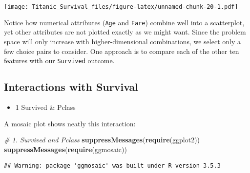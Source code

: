\documentclass[]{article}
\newenvironment{Shaded}{\begin{snugshade}}{\end{snugshade}}
\newcommand{\KeywordTok}[1]{\textcolor[rgb]{0.13,0.29,0.53}{\textbf{#1}}}
\newcommand{\DataTypeTok}[1]{\textcolor[rgb]{0.13,0.29,0.53}{#1}}
\newcommand{\DecValTok}[1]{\textcolor[rgb]{0.00,0.00,0.81}{#1}}
\newcommand{\StringTok}[1]{\textcolor[rgb]{0.31,0.60,0.02}{#1}}
\newcommand{\CommentTok}[1]{\textcolor[rgb]{0.56,0.35,0.01}{\textit{#1}}}
\newcommand{\OperatorTok}[1]{\textcolor[rgb]{0.81,0.36,0.00}{\textbf{#1}}}
\newcommand{\NormalTok}[1]{#1}
\providecommand{\tightlist}{%
  \setlength{\itemsep}{0pt}\setlength{\parskip}{0pt}}
\begin{document}
\texttt{[image: Titanic\_Survival\_files/figure-latex/unnamed-chunk-20-1.pdf]}

Notice how numerical attributes (\texttt{Age} and \texttt{Fare}) combine
well into a scatterplot, yet other attributes are not plotted exactly as
we might want. Since the problem space will only increase with
higher-dimensional combinations, we select only a few choice pairs to
consider. One approach is to compare each of the other ten features with
our \texttt{Survived} outcome.

\subsection{Interactions with
Survival}\label{interactions-with-survival}

\begin{itemize}
\tightlist
\item
  1 Survived \& Pclass
\end{itemize}

A mosaic plot shows neatly this interaction:

\begin{Shaded}
\begin{Highlighting}[]
\CommentTok{# 1. Survived and Pclass }
\KeywordTok{suppressMessages}\NormalTok{(}\KeywordTok{require}\NormalTok{(ggplot2))}
\KeywordTok{suppressMessages}\NormalTok{(}\KeywordTok{require}\NormalTok{(ggmosaic))}
\end{Highlighting}
\end{Shaded}

\begin{verbatim}
## Warning: package 'ggmosaic' was built under R version 3.5.3
\end{verbatim}

\begin{Shaded}
\end{Shaded}
\end{document}
